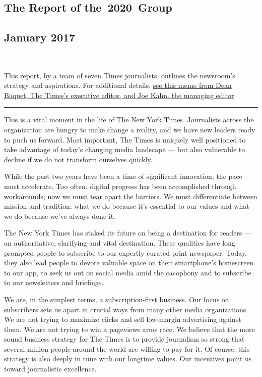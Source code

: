 \hypertarget{the-report-of-the-2020-group}{%
\subsection{The Report of
the~2020~Group}\label{the-report-of-the-2020-group}}

\hypertarget{january-2017}{%
\subsection{January 2017}\label{january-2017}}

\texttt{\ \ } \texttt{\ \ }

This report, by a team of seven Times journalists, outlines the
newsroom's strategy and aspirations. For additional details,
\href{http://www.nytco.com/from-dean-and-joe-the-year-ahead}{see this
memo from Dean Baquet, The Times's executive editor, and Joe Kahn, the
managing editor}.

\begin{center}\rule{0.5\linewidth}{\linethickness}\end{center}

This is a vital moment in the life of The New York Times. Journalists
across the organization are hungry to make change a reality, and we have
new leaders ready to push us forward. Most important, The Times is
uniquely well positioned to take advantage of today's changing media
landscape --- but also vulnerable to decline if we do not transform
ourselves quickly.

While the past two years have been a time of significant innovation, the
pace must accelerate. Too often, digital progress has been accomplished
through workarounds; now we must tear apart the barriers. We must
differentiate between mission and tradition: what we do because it's
essential to our values and what we do because we've always done it.

The New York Times has staked its future on being a destination for
readers --- an authoritative, clarifying and vital destination. These
qualities have long prompted people to subscribe to our expertly curated
print newspaper. Today, they also lead people to devote valuable space
on their smartphone's homescreen to our app, to seek us out on social
media amid the cacophony and to subscribe to our newsletters and
briefings.

We are, in the simplest terms, a subscription-first business. Our focus
on subscribers sets us apart in crucial ways from many other media
organizations. We are not trying to maximize clicks and sell low-margin
advertising against them. We are not trying to win a pageviews arms
race. We believe that the more sound business strategy for The Times is
to provide journalism so strong that several million people around the
world are willing to pay for it. Of course, this strategy is also deeply
in tune with our longtime values. Our incentives point us toward
journalistic excellence.

